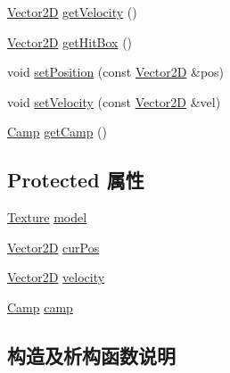 \begin{DoxyCompactItemize}
\item 
\hyperlink{_vector2_d_8hpp_aa1f1145650f1dd9bddf7335ec6434d7c}{Vector2D} \hyperlink{class_entity_a00fb331557faca43b55eadc30f03c746}{get\+Velocity} ()
\item 
\hyperlink{_vector2_d_8hpp_aa1f1145650f1dd9bddf7335ec6434d7c}{Vector2D} \hyperlink{class_entity_a973839fe04fc483c016d8f09e1c6f52a}{get\+Hit\+Box} ()
\item 
void \hyperlink{class_entity_a372b9155542c8a228a4f1305f5f67341}{set\+Position} (const \hyperlink{_vector2_d_8hpp_aa1f1145650f1dd9bddf7335ec6434d7c}{Vector2D} \&pos)
\item 
void \hyperlink{class_entity_af41c73b5b2a7e68a7f285b12d0dab9f1}{set\+Velocity} (const \hyperlink{_vector2_d_8hpp_aa1f1145650f1dd9bddf7335ec6434d7c}{Vector2D} \&vel)
\item 
\hyperlink{_entity_8h_ad54c4fe39f1c51b786c24ae0b7763b44}{Camp} \hyperlink{class_entity_aad037bf3c41999855c70a47c58f3bf0a}{get\+Camp} ()
\end{DoxyCompactItemize}
\subsection*{Protected 属性}
\begin{DoxyCompactItemize}
\item 
\hyperlink{struct_texture}{Texture} \hyperlink{class_entity_a22ccba8fb86e5b4e10b2c33b6f56d238}{model}
\item 
\hyperlink{_vector2_d_8hpp_aa1f1145650f1dd9bddf7335ec6434d7c}{Vector2D} \hyperlink{class_entity_a5031aa6b058f2231daad16b35e3d536d}{cur\+Pos}
\item 
\hyperlink{_vector2_d_8hpp_aa1f1145650f1dd9bddf7335ec6434d7c}{Vector2D} \hyperlink{class_entity_a386d25b56772b8913eb3e5adc636f6e0}{velocity}
\item 
\hyperlink{_entity_8h_ad54c4fe39f1c51b786c24ae0b7763b44}{Camp} \hyperlink{class_entity_a5326accd49d3817310ec90692b9da3df}{camp}
\end{DoxyCompactItemize}


\subsection{构造及析构函数说明}
\mbox{\label{class_entity_a604327e36e9783d29dd6ae6e4626777a}} 
